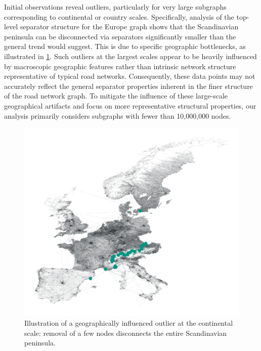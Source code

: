 Initial observations reveal outliers, particularly for very large subgraphs corresponding to continental or country scales.
Specifically, analysis of the top-level separator structure for the Europe graph shows that the Scandinavian peninsula can be disconnected via separators significantly smaller than the general trend would suggest.
This is due to specific geographic bottlenecks, as illustrated in \cref{fig:europe_top_separator}.
Such outliers at the largest scales appear to be heavily influenced by macroscopic geographic features rather than intrinsic network structure representative of typical road networks.
Consequently, these data points may not accurately reflect the general separator properties inherent in the finer structure of the road network graph.
To mitigate the influence of these large-scale geographical artifacts and focus on more representative structural properties, our analysis primarily considers subgraphs with fewer than 10,000,000 nodes.

\begin{figure}[tbhp]
    \centering
    \includegraphics[width=0.6\linewidth]{graphics/europe-top-level-sep.png}
    \caption{Illustration of a geographically influenced outlier at the continental scale: removal of a few nodes disconnects the entire Scandinavian peninsula.}
    \label{fig:europe_top_separator}
\end{figure}

